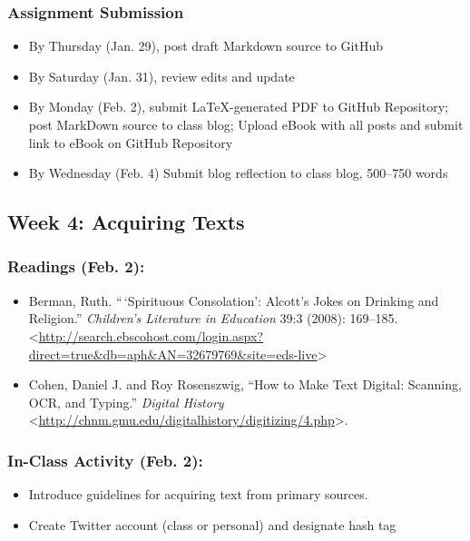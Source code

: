 \documentclass[]{article}
\begin{document}
\subsubsection{Assignment Submission}\label{assignment-submission}

\begin{itemize}
\itemsep1pt\parskip0pt
\item
  By Thursday (Jan. 29), post draft Markdown source to GitHub
\item
  By Saturday (Jan. 31), review edits and update
\item
  By Monday (Feb. 2), submit LaTeX-generated PDF to GitHub Repository;
  post MarkDown source to class blog; Upload eBook with all posts and
  submit link to eBook on GitHub Repository
\item
  By Wednesday (Feb. 4) Submit blog reflection to class blog, 500--750
  words
\end{itemize}

\subsection{Week 4: Acquiring Texts}\label{week-4-acquiring-texts}

\subsubsection{Readings (Feb. 2):}\label{readings-feb.-2}

\begin{itemize}
\itemsep1pt\parskip0pt
\item
  Berman, Ruth. ``\,`Spirituous Consolation': Alcott's Jokes on Drinking
  and Religion.'' \emph{Children's Literature in Education} 39:3 (2008):
  169--185.
  \textless{}\url{http://search.ebscohost.com/login.aspx?direct=true\&db=aph\&AN=32679769\&site=eds-live}\textgreater{}
\item
  Cohen, Daniel J. and Roy Rosenszwig, ``How to Make Text Digital:
  Scanning, OCR, and Typing.'' \emph{Digital History}
  \textless{}\url{http://chnm.gmu.edu/digitalhistory/digitizing/4.php}\textgreater{}.
\end{itemize}

\subsubsection{In-Class Activity (Feb.
2):}\label{in-class-activity-feb.-2}

\begin{itemize}
\itemsep1pt\parskip0pt
\item
  Introduce guidelines for acquiring text from primary sources.
\item
  Create Twitter account (class or personal) and designate hash tag
\end{itemize}
\end{document}
